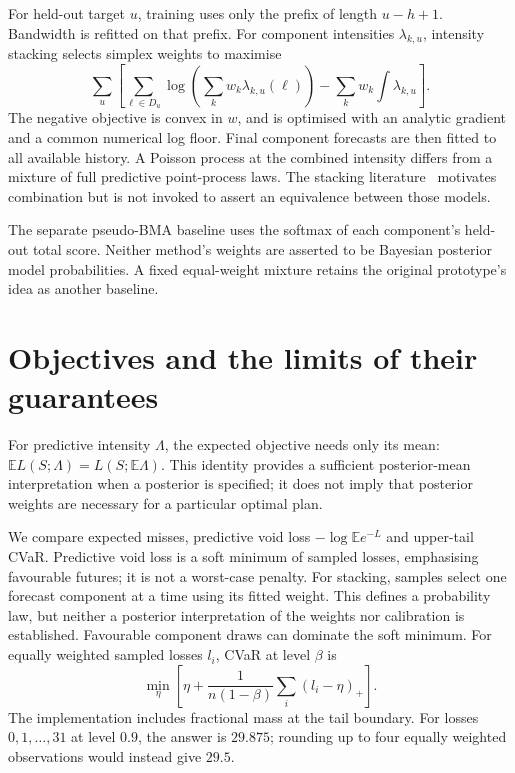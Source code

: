 \documentclass[11pt]{article}
\newcommand{\E}{\mathbb E}
\begin{document}
For held-out target $u$, training uses only the prefix of length $u-h+1$.
Bandwidth is refitted on that prefix. For component intensities
$\lambda_{k,u}$, intensity stacking selects simplex weights to maximise
\begin{equation}
\sum_u\left[\sum_{\ell\in D_u}\log\left(\sum_k w_k\lambda_{k,u}(\ell)\right)
-\sum_k w_k\int\lambda_{k,u}\right].
\end{equation}
The negative objective is convex in $w$, and is optimised with an analytic
gradient and a common numerical log floor. Final component forecasts are
then fitted to all available history. A Poisson process at the combined
intensity differs from a mixture of full predictive point-process laws.
The stacking literature~\cite{yao2018stacking} motivates combination but
is not invoked to assert an equivalence between those models.

The separate pseudo-BMA baseline uses the softmax of each component's
held-out total score. Neither method's weights are asserted to be Bayesian
posterior model probabilities. A fixed equal-weight mixture retains the
original prototype's idea as another baseline.

\section{Objectives and the limits of their guarantees}
For predictive intensity $\Lambda$, the expected objective needs only its
mean: $\E L(S;\Lambda)=L(S;\E\Lambda)$. This identity provides a sufficient
posterior-mean interpretation when a posterior is specified; it does not
imply that posterior weights are necessary for a particular optimal plan.

We compare expected misses, predictive void loss
$-\log\E e^{-L}$ and upper-tail CVaR. Predictive void loss is a soft minimum
of sampled losses, emphasising favourable futures; it is not a worst-case
penalty. For stacking, samples select one forecast component at a time
using its fitted weight. This defines a probability law, but neither a
posterior interpretation of the weights nor calibration is established.
Favourable component draws can dominate the soft minimum.
For equally weighted sampled losses $l_i$, CVaR at level $\beta$ is
\[
\min_\eta\left[\eta+\frac{1}{n(1-\beta)}\sum_i(l_i-\eta)_+\right].
\]
The implementation includes fractional mass at the tail boundary. For
losses $0,1,\ldots,31$ at level $0.9$, the answer is $29.875$; rounding up
to four equally weighted observations would instead give $29.5$.
\end{document}
